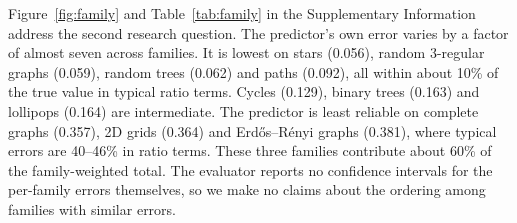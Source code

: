 \documentclass{article}
\begin{document}
Figure~\ref{fig:family} and Table~\ref{tab:family} in the Supplementary Information address the second research question. The predictor's own error varies by a factor of almost seven across families. %
 It is lowest on stars (0.056), random 3-regular graphs (0.059), random trees (0.062) and paths (0.092), all within about 10\% of the true value in typical ratio terms. %
Cycles (0.129), binary trees (0.163) and lollipops (0.164) are intermediate. %
The predictor is least reliable on complete graphs (0.357), 2D grids (0.364) and Erd\H{o}s--R\'enyi graphs (0.381), where typical errors are 40--46\% in ratio terms. %
These three families contribute about 60\% of the family-weighted total. %
The evaluator reports no confidence intervals for the per-family errors themselves, so we make no claims about the ordering among families with similar errors.
\end{document}
